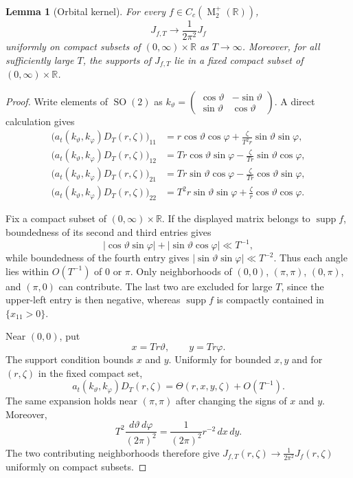 \documentclass[reqno,11pt]{amsart}
\newtheorem{lem}[lem]{Lemma}
\theoremstyle{definition}
\theoremstyle{remark}
\numberwithin{equation}{section}
\newcommand{\M}{\operatorname{M}}
\newcommand{\SO}{\operatorname{SO}}
\newcommand{\supp}{\operatorname{supp}}
\begin{document}
\begin{lem}[Orbital kernel]
\label{lem:orbital-kernel-d2}
For every $f\in C_c(\M_2^+(\mathbb R))$,
\[
J_{f,T}\to \frac{1}{2\pi^2}J_f
\]
uniformly on compact subsets of $(0,\infty)\times\mathbb R$ as
$T\to\infty$. Moreover, for all sufficiently large $T$, the supports of
$J_{f,T}$ lie in a fixed compact subset of
$(0,\infty)\times\mathbb R$.
\end{lem}
\begin{proof}
Write elements of $\SO(2)$ as
$
k_\vartheta
=
\begin{pmatrix}
\cos\vartheta&-\sin\vartheta\\
\sin\vartheta&\cos\vartheta
\end{pmatrix}.
$
A direct calculation gives
$$
\begin{aligned}
\bigl(a_t(k_\vartheta,k_\varphi)D_T(r,\zeta)\bigr)_{11}
&=
r\cos\vartheta\cos\varphi
+
\frac{\zeta}{T^2r}\sin\vartheta\sin\varphi,\\
\bigl(a_t(k_\vartheta,k_\varphi)D_T(r,\zeta)\bigr)_{12}
&=
Tr\cos\vartheta\sin\varphi
-
\frac{\zeta}{Tr}\sin\vartheta\cos\varphi,\\
\bigl(a_t(k_\vartheta,k_\varphi)D_T(r,\zeta)\bigr)_{21}
&=
Tr\sin\vartheta\cos\varphi
-
\frac{\zeta}{Tr}\cos\vartheta\sin\varphi,\\
\bigl(a_t(k_\vartheta,k_\varphi)D_T(r,\zeta)\bigr)_{22}
&=
T^2r\sin\vartheta\sin\varphi
+
\frac{\zeta}{r}\cos\vartheta\cos\varphi.
\end{aligned}
$$

Fix a compact subset of $(0,\infty)\times\mathbb R$. If the displayed
matrix belongs to $\supp f$, boundedness of its second and third entries
gives
$$
|\cos\vartheta\sin\varphi|
+
|\sin\vartheta\cos\varphi|
\ll T^{-1},
$$
while boundedness of the fourth entry gives
$|\sin\vartheta\sin\varphi|\ll T^{-2}$. Thus each angle lies within
$O(T^{-1})$ of $0$ or $\pi$. Only neighborhoods of
$(0,0)$, $(\pi,\pi)$, $(0,\pi)$, and $(\pi,0)$ can contribute. The last
two are excluded for large $T$, since the upper-left entry is then
negative, whereas $\supp f$ is compactly contained in $\{x_{11}>0\}$.

Near $(0,0)$, put
$$
x=Tr\vartheta,
\qquad
y=Tr\varphi.
$$
The support condition bounds $x$ and $y$. Uniformly for bounded $x,y$ and
for $(r,\zeta)$ in the fixed compact set,
$$
a_t(k_\vartheta,k_\varphi)D_T(r,\zeta)
=
\Theta(r,x,y,\zeta)+O(T^{-1}).
$$
The same expansion holds near $(\pi,\pi)$ after changing the signs of
$x$ and $y$. Moreover,
$$
T^2\frac{d\vartheta\,d\varphi}{(2\pi)^2}
=
\frac{1}{(2\pi)^2}r^{-2}\,dx\,dy.
$$
The two contributing neighborhoods therefore give
$
J_{f,T}(r,\zeta)
\to
\frac{1}{2\pi^2}J_f(r,\zeta)
$
uniformly on compact subsets.



\end{proof}
\end{document}
